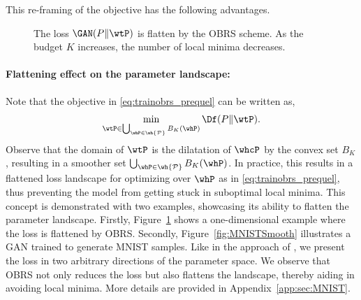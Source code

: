 \documentclass[twoside]{article}
\begin{document}
This re-framing of the objective has the following advantages.

\setlength{\textfloatsep}{15pt}




\begin{figure}[t!]
\vspace{10pt}
   \caption{The loss $\GAN(P\Vert\wtP)$ is flatten by the OBRS scheme. As the budget $K$ increases, the number of local minima decreases. } \label{fig:Smooth}
\end{figure}

\paragraph{Flattening effect on the parameter landscape:}
Note that the objective in \eqref{eq:trainobrs_prequel} can be written as, 
\begin{align}\label{eq:trainobrs}
    \min_{\wtP\in \bigcup_{\whP \in \wh{\cal P}}B_K(\whP)}  \Df(P\Vert \wtP).
\end{align}
Observe that the domain of $\wtP$ is the dilatation of $\whcP$ by the convex set $B_K$, resulting in a smoother set $\bigcup_{\whP \in \wh{\cal P}}B_K(\whP)$. In practice, this results in a flattened loss landscape for optimizing over $\whP$ as in \eqref{eq:trainobrs_prequel}, thus preventing the model from getting stuck in suboptimal local minima. 
This concept is demonstrated with two examples, showcasing its ability to flatten the parameter landscape. Firstly, Figure~\ref{fig:Smooth} shows a one-dimensional example where the loss is flattened by OBRS. Secondly, Figure~\ref{fig:MNISTSmooth} illustrates a GAN trained to generate MNIST samples. Like in the approach of \cite{li_visualizing_2018}, we present the loss in two arbitrary directions of the parameter space. We observe that OBRS not only reduces the loss but also flattens the landscape, thereby aiding in avoiding local minima. More details are provided in Appendix~\ref{app:sec:MNIST}. 
\end{document}
